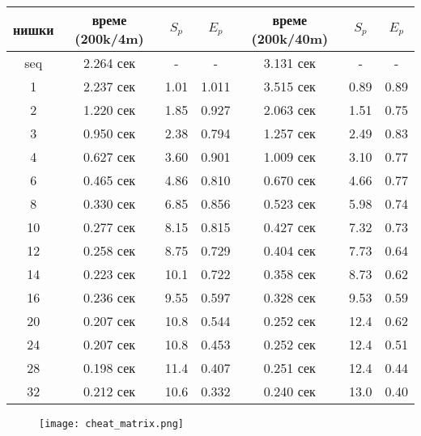 \begin{center}
\begin{tabular}{ c | c c c | c c c | }
  нишки & време (200k/4m) & $S_p$ & $E_p$ & време (200k/40m) & $S_p$ & $E_p$ \\
  \hline
  seq & 2.264 сек & - & - & 3.131 сек & - & - \\
  1  & 2.237 сек & 1.01 & 1.011 & 3.515 сек & 0.89 & 0.89 \\
  2  & 1.220 сек & 1.85 & 0.927 & 2.063 сек & 1.51 & 0.75 \\
  3  & 0.950 сек & 2.38 & 0.794 & 1.257 сек & 2.49 & 0.83 \\
  4  & 0.627 сек & 3.60 & 0.901 & 1.009 сек & 3.10 & 0.77 \\
  6  & 0.465 сек & 4.86 & 0.810 & 0.670 сек & 4.66 & 0.77 \\
  8  & 0.330 сек & 6.85 & 0.856 & 0.523 сек & 5.98 & 0.74 \\
  10 & 0.277 сек & 8.15 & 0.815 & 0.427 сек & 7.32 & 0.73 \\
  12 & 0.258 сек & 8.75 & 0.729 & 0.404 сек & 7.73 & 0.64 \\
  14 & 0.223 сек & 10.1 & 0.722 & 0.358 сек & 8.73 & 0.62 \\
  16 & 0.236 сек & 9.55 & 0.597 & 0.328 сек & 9.53 & 0.59 \\
  20 & 0.207 сек & 10.8 & 0.544 & 0.252 сек & 12.4 & 0.62 \\
  24 & 0.207 сек & 10.8 & 0.453 & 0.252 сек & 12.4 & 0.51 \\
  28 & 0.198 сек & 11.4 & 0.407 & 0.251 сек & 12.4 & 0.44 \\
  32 & 0.212 сек & 10.6 & 0.332 & 0.240 сек & 13.0 & 0.40 \\
\end{tabular}
\end{center}

\begin{figure}[H]
  \centering
  \texttt{[image: cheat\_matrix.png]}
\end{figure}
